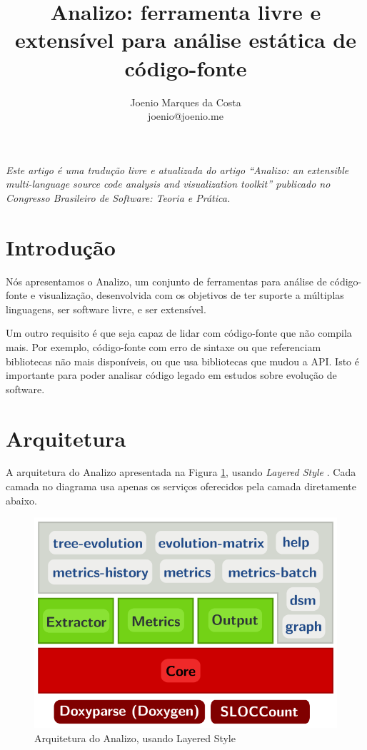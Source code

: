 \documentclass{article}
\title{
  Analizo: ferramenta livre e extensível para análise estática de código-fonte
}
\author{Joenio Marques da Costa\\
  {\small joenio@joenio.me}
}
\begin{document}
\maketitle

{\it Este artigo é uma tradução livre e atualizada do artigo ``Analizo: an
extensible multi-language source code analysis and visualization toolkit''
\cite{Terceiro2010Analizo} publicado no Congresso Brasileiro de Software:
Teoria e Prática.}

\section{Introdução}

Nós apresentamos o Analizo, um conjunto de ferramentas para análise de código-fonte
e visualização, desenvolvida com os objetivos de ter suporte a múltiplas linguagens,
ser software livre, e ser extensível.

Um outro requisito é que seja capaz de lidar com código-fonte que não compila mais.
Por exemplo, código-fonte com erro de sintaxe ou que referenciam bibliotecas não mais
disponíveis, ou que usa bibliotecas que mudou a API. Isto é importante para poder analisar
código legado em estudos sobre evolução de software.

\section{Arquitetura}

A arquitetura do Analizo apresentada na Figura \ref{arquitetura-analizo},
usando {\it Layered Style} \cite{Clements2002}. Cada camada no diagrama usa
apenas os serviços oferecidos pela camada diretamente abaixo.

\begin{figure}[h]
\center
\includegraphics[scale=0.4]{analizo-architecture.png}
\caption{Arquitetura do Analizo, usando Layered Style \cite{Clements2002}}
\label{arquitetura-analizo}
\end{figure}
\end{document}
